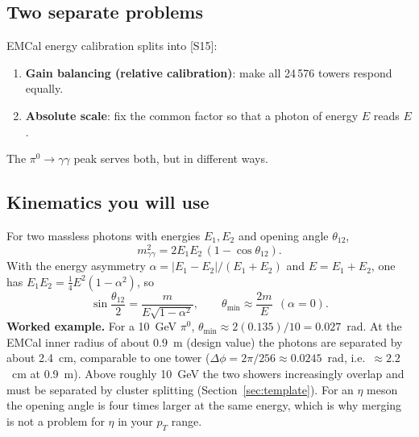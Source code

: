 \documentclass[11pt,letterpaper]{article}
\begin{document}
\subsection{Two separate problems}
EMCal energy calibration splits into [S15]:
\begin{enumerate}
\item \textbf{Gain balancing (relative calibration)}: make all 24\,576 towers respond equally.
\item \textbf{Absolute scale}: fix the common factor so that a photon of energy $E$ reads $E$.
\end{enumerate}
The $\pi^0\to\gamma\gamma$ peak serves both, but in different ways.

\subsection{Kinematics you will use}
For two massless photons with energies $E_1,E_2$ and opening angle $\theta_{12}$,
\begin{equation}
m_{\gamma\gamma}^2 = 2E_1E_2\,(1-\cos\theta_{12}).
\end{equation}
With the energy asymmetry $\alpha=|E_1-E_2|/(E_1+E_2)$ and $E=E_1+E_2$, one has $E_1E_2=\tfrac14E^2(1-\alpha^2)$, so
\begin{equation}
\sin\frac{\theta_{12}}{2} = \frac{m}{E\sqrt{1-\alpha^2}}, \qquad \theta_{\min}\approx\frac{2m}{E}\ \ (\alpha=0).
\end{equation}
\textbf{Worked example.} For a 10~GeV $\pi^0$, $\theta_{\min}\approx2(0.135)/10=0.027$~rad. At the EMCal inner radius of about 0.9~m (design value) the photons are separated by about 2.4~cm,
comparable to one tower ($\Delta\phi=2\pi/256\approx0.0245$~rad, i.e.\ $\approx2.2$~cm at 0.9~m). Above roughly 10~GeV the two showers increasingly overlap and must be separated by cluster splitting (Section~\ref{sec:template}).
For an $\eta$ meson the opening angle is four times larger at the same energy, which is why merging is not a problem for $\eta$ in your $p_T$ range.
\end{document}
